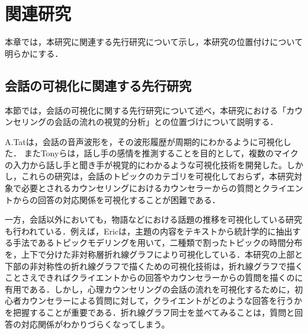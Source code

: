 \documentclass[shuuron]{kuee}
\begin{document}







\chapter{関連研究}%






本章では，本研究に関連する先行研究について示し，本研究の位置付けについて明らかにする．%

\section{会話の可視化に関連する先行研究}

本節では，会話の可視化に関する先行研究について述べ，本研究における「カウンセリングの会話の流れの視覚的分析」との位置づけについて説明する．%

A.Tat\cite{tat2002visualising}は，会話の音声波形を，その波形履歴が周期的にわかるように可視化した．
またTonyら\cite{bergstrom2007seeing}は，話し手の感情を推測することを目的として，複数のマイクの入力から話し手と聞き手が視覚的にわかるような可視化技術を開発した。しかし，これらの研究は，会話のトピックのカテゴリを可視化しておらず，本研究対象で必要とされるカウンセリングにおけるカウンセラーからの質問とクライエントからの回答の対応関係を可視化することが困難である．

一方，会話以外においても，物語などにおける話題の推移を可視化している研究も行われている．例えば，Eric\cite{taskdriven}は，主題の内容をテキストから統計学的に抽出する手法であるトピックモデリングを用いて，二種類で割ったトピックの時間分布を，上下で分けた非対称層折れ線グラフにより可視化している．本研究の上部と下部の非対称性の折れ線グラフで描くための可視化技術は，折れ線グラフで描くことさえできればクライエントからの回答やカウンセラーからの質問を描くのに有用である．しかし，心理カウンセリングの会話の流れを可視化するために，初心者カウンセラーによる質問に対して，クライエントがどのような回答を行うかを把握することが重要である．折れ線グラフ同士を並べてみることは，質問と回答の対応関係がわかりづらくなってしまう。
\end{document}
